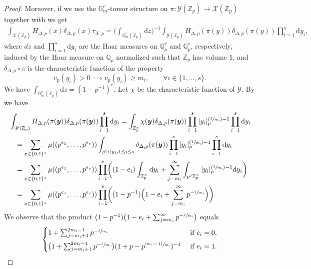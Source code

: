 \documentclass[JEP,XML,SOM,Unicode,published]{cedram}
\newcommand{\Psfrac}[2]{(\sfrac{#1}{#2})}
\newcommand{\psfrac}[2]{\sfrac{(#1)}{#2}}
\newcommand{\bfy}{\boldsymbol{y}}
\newcommand{\bfe}{\boldsymbol{e}}
\newcommand\ZZ{\mathbb{Z}}
\newcommand\QQ{\mathbb{Q}}
\newcommand\GG{\mathbb{G}}
\theoremstyle{definition}
\numberwithin{theorem}{section}
\begin{document}
\begin{proof}
Moreover, if we use the $\GG_m^r$-torsor structure on
$\pi:\mathscr Y(\ZZ_p)\to\mathscr X(\ZZ_p)$ together
with \cite[Cor.\,2.23, Prop.\,9.7, 9.13 \& 9.14]{MR1679841} we get
\begin{gather*}
\int_{\mathscr X(\ZZ_p)}H_{\Delta,p}(x)\delta_{\Delta,p} (x) \tau_{X,p}
=\biggl(\int_{\GG_m^r(\ZZ_p)}\mathrm d z\biggr)^{-1}
\int_{\mathscr Y(\ZZ_p)}H_{\Delta,p}(\pi(y))\delta_{\Delta,p} (\pi(y)) \prod_{i=1}^s\mathrm d y_i,
\end{gather*}
where $dz$ and $\prod_{i=1}^s\mathrm d y_i$ are the Haar measures on $\QQ_p^r$ and $\QQ_p^s$,
respectively, induced by the Haar measure on $\QQ_p$ normalized such that $\ZZ_p$ has volume $1$,
and $\delta_{\Delta,p}\circ \pi$ is the characteristic function of the property
\[
v_p(y_i)>0 \implies v_p(y_i)\geq m_i, \qquad \forall i\in\{1,\dots,s\}.
\]
We have $\int_{\GG_m^r(\ZZ_p)}\mathrm d z=(1-p^{-1})^r$.
Let $\chi$ be the characteristic function of $\mathscr Y$. By \cite[Lem.\,11.15]{MR1679841}
we have
\begin{align*}
&\int_{\mathscr Y(\ZZ_p)}H_{\Delta,p}(\pi(\bfy))\delta_{\Delta,p} (\pi(\bfy))
\prod_{i=1}^s\mathrm d y_i
=\int_{\ZZ_p^s}\chi(\bfy)\delta_{\Delta,p} (\pi(\bfy))
\prod_{i=1}^s | y_i |_p^{\Psfrac 1{m_i}-1} \prod_{i=1}^s\mathrm d y_i\\
&\hspace*{3mm}=\sum_{\bfe\in\{0,1\}^s}\mu((p^{e_1},\dots,p^{e_s}))
\int_{p^{e_i}\mid y_i, 1\leq i\leq s}\delta_{\Delta,p} (\pi(\bfy))
\prod_{i=1}^s | y_i |_p^{\Psfrac 1{m_i}-1} \prod_{i=1}^s\mathrm d y_i\\
&\hspace*{3mm}=\sum_{\bfe\in\{0,1\}^s}\mu((p^{e_1},\dots,p^{e_s}))
\prod_{i=1}^s \biggl(
(1-e_i)\int_{\ZZ_p^{\times}}\mathrm d y_i
+ \sum_{j=m_i}^\infty\int_{p^j\ZZ_p^\times}|y_i|_p^{\Psfrac 1{m_i}-1} \mathrm d y_i
\biggr)\\
&\hspace*{3mm}=\sum_{\bfe\in\{0,1\}^s}\mu((p^{e_1},\dots,p^{e_s}))
\prod_{i=1}^s\biggl(
(1-p^{-1})\Bigl(1-e_i +\sum_{j=m_i}^\infty p^{-\sfrac j{m_i}}\Bigr)
\biggr).
\end{align*}
We observe that the product
$(1-p^{-1})\bigl (1-e_i +\sum_{j=m_i}^\infty p^{-\sfrac j{m_i}}\bigr)$ equals
\[
\begin{cases}
1+\sum_{j=m_i+1}^{2m_{i}-1}p^{-\sfrac j{m_i}}
& \text{ if } e_i=0,\\[5pt]
\bigl(1+\sum_{j=m_i+1}^{2m_{i}-1}p^{-\sfrac j{m_i}} \bigr)
(1+p-p^{\psfrac {m_i-1}{m_i}})^{-1}
& \text{ if } e_i=1.
\end{cases}
\]
\end{proof}
\end{document}
